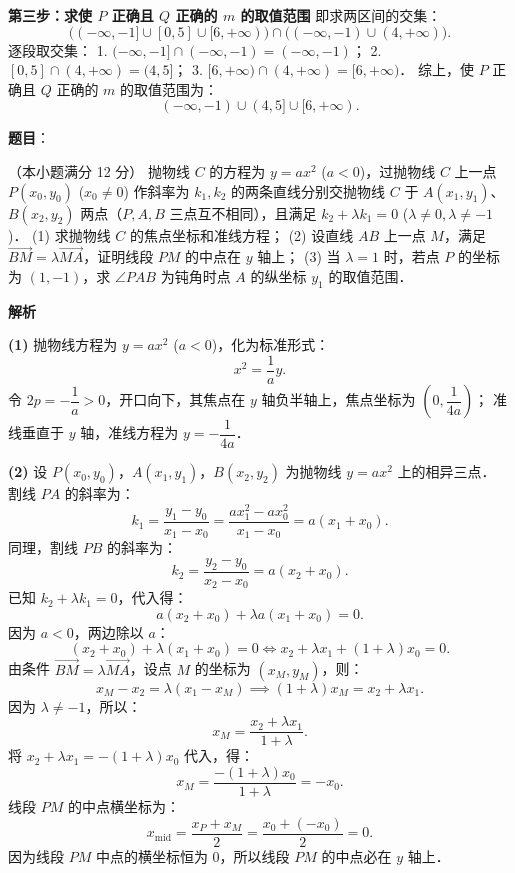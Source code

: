 \begin{answer}
\textbf{第三步：求使 $P$ 正确且 $Q$ 正确的 $m$ 的取值范围}
即求两区间的交集：
\nopagebreak[4]
\[
\Big((-\infty, -1] \cup [0, 5] \cup [6, +\infty)\Big) \cap \Big((-\infty, -1) \cup (4, +\infty)\Big).
\]
逐段取交集：
1. $(-\infty, -1] \cap (-\infty, -1) = (-\infty, -1)$；
2. $[0, 5] \cap (4, +\infty) = (4, 5]$；
3. $[6, +\infty) \cap (4, +\infty) = [6, +\infty)$．
综上，使 $P$ 正确且 $Q$ 正确的 $m$ 的取值范围为：
\nopagebreak[4]
\[
(-\infty, -1) \cup (4, 5] \cup [6, +\infty).
\]

\gkanswer{答案：$m$ 的取值范围为 $(-\infty, -1) \cup (4, 5] \cup [6, +\infty)$。}

\end{answer}
\begin{answer}

\textbf{题目}：

（本小题满分 12 分）
抛物线 $C$ 的方程为 $y = ax^2$ ($a < 0$)，过抛物线 $C$ 上一点 $P(x_0, y_0)$ ($x_0 \neq 0$) 作斜率为 $k_1, k_2$ 的两条直线分别交抛物线 $C$ 于 $A(x_1, y_1)$、$B(x_2, y_2)$ 两点（$P, A, B$ 三点互不相同），且满足 $k_2 + \lambda k_1 = 0$ ($\lambda \neq 0, \lambda \neq -1$)．
(1) 求抛物线 $C$ 的焦点坐标和准线方程；
(2) 设直线 $AB$ 上一点 $M$，满足 $\vec{BM} = \lambda \vec{MA}$，证明线段 $PM$ 的中点在 $y$ 轴上；
(3) 当 $\lambda = 1$ 时，若点 $P$ 的坐标为 $(1, -1)$，求 $\angle PAB$ 为钝角时点 $A$ 的纵坐标 $y_1$ 的取值范围．

\textbf{解析}

\textbf{(1)}
抛物线方程为 $y = ax^2$ ($a < 0$)，化为标准形式：
\nopagebreak[4]
\[
x^2 = \dfrac{1}{a}y.
\]
令 $2p = -\dfrac{1}{a} > 0$，开口向下，其焦点在 $y$ 轴负半轴上，焦点坐标为 $\left(0, \dfrac{1}{4a}\right)$；
准线垂直于 $y$ 轴，准线方程为 $y = -\dfrac{1}{4a}$．

\textbf{(2)}
设 $P(x_0, y_0)$，$A(x_1, y_1)$，$B(x_2, y_2)$ 为抛物线 $y = ax^2$ 上的相异三点．
割线 $PA$ 的斜率为：
\nopagebreak[4]
\[
k_1 = \dfrac{y_1 - y_0}{x_1 - x_0} = \dfrac{ax_1^2 - ax_0^2}{x_1 - x_0} = a(x_1 + x_0).
\]
同理，割线 $PB$ 的斜率为：
\nopagebreak[4]
\[
k_2 = \dfrac{y_2 - y_0}{x_2 - x_0} = a(x_2 + x_0).
\]
已知 $k_2 + \lambda k_1 = 0$，代入得：
\nopagebreak[4]
\[
a(x_2 + x_0) + \lambda a(x_1 + x_0) = 0.
\]
因为 $a < 0$，两边除以 $a$：
\nopagebreak[4]
\[
(x_2 + x_0) + \lambda(x_1 + x_0) = 0 \iff x_2 + \lambda x_1 + (1 + \lambda)x_0 = 0.
\]
由条件 $\vec{BM} = \lambda \vec{MA}$，设点 $M$ 的坐标为 $(x_M, y_M)$，则：
\nopagebreak[4]
\[
x_M - x_2 = \lambda(x_1 - x_M) \implies (1 + \lambda)x_M = x_2 + \lambda x_1.
\]
因为 $\lambda \neq -1$，所以：
\nopagebreak[4]
\[
x_M = \dfrac{x_2 + \lambda x_1}{1 + \lambda}.
\]
将 $x_2 + \lambda x_1 = -(1 + \lambda)x_0$ 代入，得：
\nopagebreak[4]
\[
x_M = \dfrac{-(1 + \lambda)x_0}{1 + \lambda} = -x_0.
\]
线段 $PM$ 的中点横坐标为：
\nopagebreak[4]
\[
x_{\text{mid}} = \dfrac{x_P + x_M}{2} = \dfrac{x_0 + (-x_0)}{2} = 0.
\]
因为线段 $PM$ 中点的横坐标恒为 $0$，所以线段 $PM$ 的中点必在 $y$ 轴上．


\end{answer}
